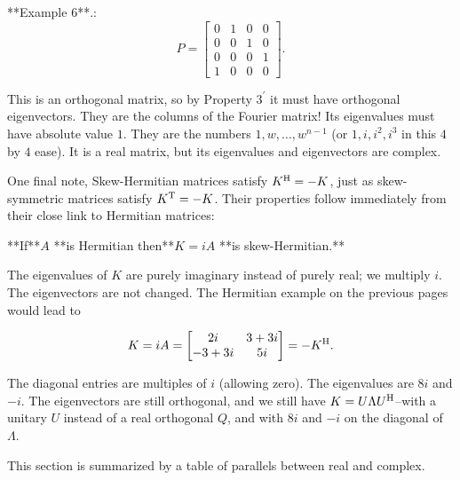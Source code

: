 

**Example 6**.: \[P=\begin{bmatrix}0&1&0&0\\ 0&0&1&0\\ 0&0&0&1\\ 1&0&0&0\end{bmatrix}.\]

This is an orthogonal matrix, so by Property \(3^{\prime}\) it must have orthogonal eigenvectors. They are the columns of the Fourier matrix! Its eigenvalues must have absolute value \(1\). They are the numbers \(1,w,\ldots,w^{n-1}\) (or \(1,i,i^{2},i^{3}\) in this \(4\) by \(4\) ease). It is a real matrix, but its eigenvalues and eigenvectors are complex.

One final note, Skew-Hermitian matrices satisfy \(K^{\rm H}=-K\), just as skew-symmetric matrices satisfy \(K^{\rm T}=-K\). Their properties follow immediately from their close link to Hermitian matrices:

**If**\(A\) **is Hermitian then**\(K=iA\) **is skew-Hermitian.**

The eigenvalues of \(K\) are purely imaginary instead of purely real; we multiply \(i\). The eigenvectors are not changed. The Hermitian example on the previous pages would lead to

\[K=iA=\begin{bmatrix}2i&3+3i\\ -3+3i&5i\end{bmatrix}=-K^{\rm H}.\]

The diagonal entries are multiples of \(i\) (allowing zero). The eigenvalues are \(8i\) and \(-i\). The eigenvectors are still orthogonal, and we still have \(K=U\Lambda U^{\rm H}\)--with a unitary \(U\) instead of a real orthogonal \(Q\), and with \(8i\) and \(-i\) on the diagonal of \(\Lambda\).

This section is summarized by a table of parallels between real and complex.

